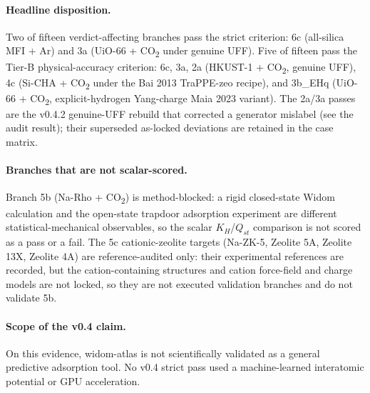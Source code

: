 \paragraph{Headline disposition.} Two of fifteen verdict-affecting branches pass the strict criterion: 6c (all-silica MFI + Ar) and 3a (UiO-66 + CO\textsubscript{2} under genuine UFF). Five of fifteen pass the Tier-B physical-accuracy criterion: 6c, 3a, 2a (HKUST-1 + CO\textsubscript{2}, genuine UFF), 4c (Si-CHA + CO\textsubscript{2} under the Bai 2013 TraPPE-zeo recipe), and 3b\_EHq (UiO-66 + CO\textsubscript{2}, explicit-hydrogen Yang-charge Maia 2023 variant). The 2a/3a passes are the v0.4.2 genuine-UFF rebuild that corrected a generator mislabel (see the audit result); their superseded as-locked deviations are retained in the case matrix.

\paragraph{Branches that are not scalar-scored.} Branch 5b (Na-Rho + CO\textsubscript{2}) is method-blocked: a rigid closed-state Widom calculation and the open-state trapdoor adsorption experiment are different statistical-mechanical observables, so the scalar \(K_H\)/\(Q_{st}\) comparison is not scored as a pass or a fail. The 5c cationic-zeolite targets (Na-ZK-5, Zeolite 5A, Zeolite 13X, Zeolite 4A) are reference-audited only: their experimental references are recorded, but the cation-containing structures and cation force-field and charge models are not locked, so they are not executed validation branches and do not validate 5b.

\paragraph{Scope of the v0.4 claim.} On this evidence, widom-atlas is not scientifically validated as a general predictive adsorption tool. No v0.4 strict pass used a machine-learned interatomic potential or GPU acceleration.

